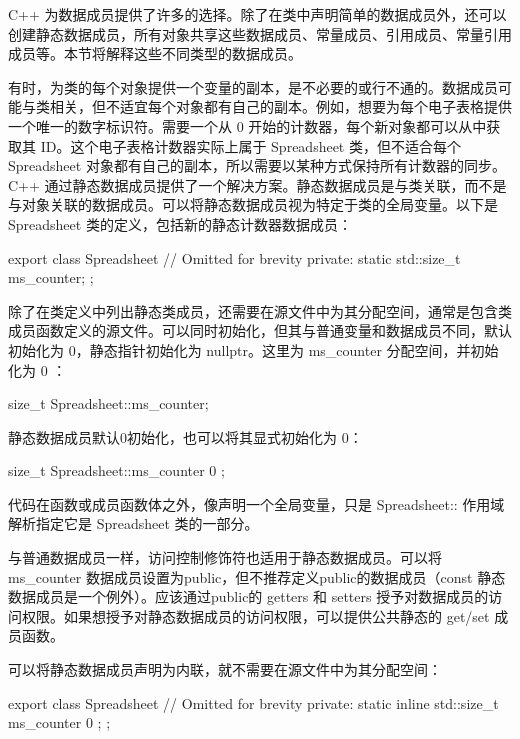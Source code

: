 
C++ 为数据成员提供了许多的选择。除了在类中声明简单的数据成员外，还可以创建静态数据成员，所有对象共享这些数据成员、常量成员、引用成员、常量引用成员等。本节将解释这些不同类型的数据成员。


有时，为类的每个对象提供一个变量的副本，是不必要的或行不通的。数据成员可能与类相关，但不适宜每个对象都有自己的副本。例如，想要为每个电子表格提供一个唯一的数字标识符。需要一个从 0 开始的计数器，每个新对象都可以从中获取其 ID。这个电子表格计数器实际上属于 Spreadsheet 类，但不适合每个 Spreadsheet 对象都有自己的副本，所以需要以某种方式保持所有计数器的同步。C++ 通过静态数据成员提供了一个解决方案。静态数据成员是与类关联，而不是与对象关联的数据成员。可以将静态数据成员视为特定于类的全局变量。以下是 Spreadsheet 类的定义，包括新的静态计数器数据成员：

\begin{cpp}
export class Spreadsheet
{
    // Omitted for brevity
    private:
    static std::size_t ms_counter;
};
\end{cpp}

除了在类定义中列出静态类成员，还需要在源文件中为其分配空间，通常是包含类成员函数定义的源文件。可以同时初始化，但其与普通变量和数据成员不同，默认初始化为 0，静态指针初始化为 nullptr。这里为 ms\_counter 分配空间，并初始化为 0 ：

\begin{cpp}
size_t Spreadsheet::ms_counter;
\end{cpp}

静态数据成员默认0初始化，也可以将其显式初始化为 0：

\begin{cpp}
size_t Spreadsheet::ms_counter { 0 };
\end{cpp}

代码在函数或成员函数体之外，像声明一个全局变量，只是 Spreadsheet:: 作用域解析指定它是 Spreadsheet 类的一部分。

与普通数据成员一样，访问控制修饰符也适用于静态数据成员。可以将 ms\_counter 数据成员设置为public，但不推荐定义public的数据成员（const 静态数据成员是一个例外）。应该通过public的 getters 和 setters 授予对数据成员的访问权限。如果想授予对静态数据成员的访问权限，可以提供公共静态的 get/set 成员函数。


可以将静态数据成员声明为内联，就不需要在源文件中为其分配空间：

\begin{cpp}
export class Spreadsheet
{
    // Omitted for brevity
    private:
        static inline std::size_t ms_counter { 0 };
};
\end{cpp}

